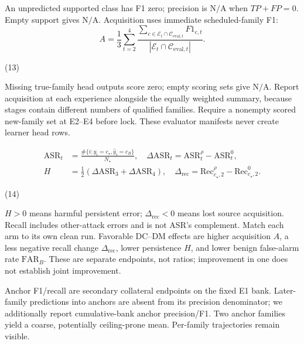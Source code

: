 \documentclass[10pt,a4paper]{article}
\newcommand{\NA}{\mathrm{N/A}}
\begin{document}
An unpredicted supported class has F1 zero; precision is $\NA$ when $TP+FP=0$. Empty support gives $\NA$. Acquisition uses immediate scheduled-family F1:
\begin{equation}
A=\frac13\sum_{t=2}^4\frac{\sum_{c\in\mathcal E_t\cap\mathcal C_{{\mathrm{eval}},t}}F1_{c,t}}{|\mathcal E_t\cap\mathcal C_{{\mathrm{eval}},t}|}.

\end{equation}
\par\hfill(13)\par

Missing true-family head outputs score zero; empty scoring sets give $\NA$. Report acquisition at each experience alongside the equally weighted summary, because stages contain different numbers of qualified families.
Require a nonempty scored new-family set at E2--E4 before lock. These evaluator manifests never create learner head rows.

\begin{equation}
\begin{aligned}
\mathrm{ASR}_t&=\frac{\#\{i:y_i=c_\star,\widehat y_i=c_B\}}{N_\star},\quad
\Delta\mathrm{ASR}_t=\mathrm{ASR}^{\rho}_t-\mathrm{ASR}^{0}_t,\\
H&=\frac12(\Delta\mathrm{ASR}_3+\Delta\mathrm{ASR}_4),\quad
\Delta_{\mathrm{rec}}=\mathrm{Rec}^{\rho}_{c_\star,2}-\mathrm{Rec}^{0}_{c_\star,2}.
\end{aligned}

\end{equation}
\par\hfill(14)\par

$H>0$ means harmful persistent error; $\Delta_{\mathrm{rec}}<0$ means lost source acquisition. Recall includes other-attack errors and is not ASR's complement. Match each arm to its own clean run. Favorable DC--DM effects are higher acquisition $A$, a less negative recall change $\Delta_{\mathrm{rec}}$, lower persistence $H$, and lower benign false-alarm rate $\mathrm{FAR}_B$. These are separate endpoints, not ratios; improvement in one does not establish joint improvement.

Anchor F1/recall are secondary collateral endpoints on the fixed E1 bank. Later-family predictions into anchors are absent from its precision denominator; we additionally report cumulative-bank anchor precision/F1. Two anchor families yield a coarse, potentially ceiling-prone mean. Per-family trajectories remain visible.
\end{document}
